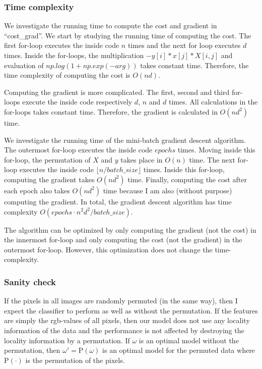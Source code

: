 \documentclass{article}
\begin{document}
	\subsubsection*{Time complexity}
	We investigate the running time to compute the cost and gradient in ``cost\_grad''.
	We start by studying the running time of computing the cost.
	The first for-loop executes the inside code $n$ times and the next for loop executes $d$ times.
	Inside the for-loops, the multiplication $-y[i]*x[j]*X[i,j]$ and evaluation of $np.log(1 + np.exp(-arg))$ takes constant time.
	Therefore, the time complexity of computing the cost is $O(nd)$.
	
	Computing the gradient is more complicated. 
	The first, second and third for-loops execute the inside code respectively $d$, $n$ and $d$ times.
	All calculations in the for-loops takes constant time.
	Therefore, the gradient is calculated in $O(nd^2)$ time.

	We investigate the running time of the mini-batch gradient descent algorithm.
	The outermost for-loop executes the inside code $epochs$ times.
	Moving inside this for-loop, the permutation of $X$ and $y$ takes place in $O(n)$ time.
	The next for-loop executes the inside code $\lfloor n/batch\_size \rfloor$ times.
	Inside this for-loop, computing the gradient takes $O(nd^2)$ time.
	Finally, computing the cost after each epoch also takes $O(nd^2)$ time because I am also (without purpose) computing the gradient.
	In total, the gradient descent algorithm has time complexity $O(epochs\cdot n^2 d^2/batch\_size)$.
	
	The algorithm can be optimized by only computing the gradient (not the cost) in the innermost for-loop and only computing the cost (not the gradient) in the outermost for-loop. 
	However, this optimization does not change the time-complexity. 
	
	\subsubsection*{Sanity check}
	If the pixels in all images are randomly permuted (in the same way), then I expect the classifier to perform as well as without the permutation.
	If the features are simply the rgb-values of all pixels, then our model does not use any locality information of the data and the performance is not affected by destroying the locality information by a permutation.
	If $\omega$ is an optimal model without the permutation, then $\omega' = \mathrm{P}(\omega)$ is an optimal model for the permuted data where $\mathrm{P}(\cdot)$ is the permutation of the pixels.
	
\end{document}
